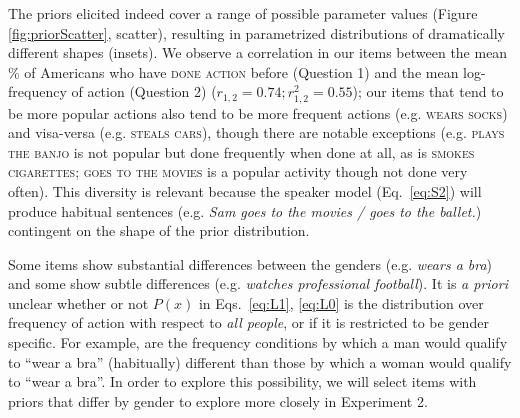 \documentclass[10pt,letterpaper]{article}
\newcommand{\ndg}[1]{\textcolor{Green}{[ndg: #1]}}
\newcommand{\mht}[1]{\textcolor{DarkOrange}{[mht: #1]}}
\begin{document}
The priors elicited indeed cover a range of possible parameter values (Figure \ref{fig:priorScatter}, scatter), resulting in parametrized distributions of dramatically different shapes (insets).  
We observe a correlation in our items between the mean \% of Americans who have \textsc{done action} before (Question 1) and the mean log-frequency  of action (Question 2) ($r_{1,2} = 0.74; r^2_{1,2} = 0.55$); our items that tend to be more popular actions also tend to be more frequent actions (e.g. \textsc{wears socks}) and visa-versa (e.g. \textsc{steals cars}), though there are notable exceptions (e.g. \textsc{plays the banjo} is not popular but done frequently when done at all, as is \textsc{smokes cigarettes}; \textsc{goes to the movies} is a popular activity though not done very often). 
This diversity is relevant because the speaker model (Eq.~\ref{eq:S2}) will produce habitual sentences (e.g. \emph{Sam goes to the movies / goes to the ballet.}) contingent on the shape of the prior distribution. 

Some items show substantial differences between the genders (e.g. \emph{wears a bra}) and some show subtle differences (e.g. \emph{watches professional football}). 
It is \emph{a priori} unclear whether or not $P(x)$ in Eqs.~\ref{eq:L1}, \ref{eq:L0} is the distribution over frequency of action with respect to \emph{all people}, or if it is restricted to be gender specific.
For example, are the frequency conditions by which a man would qualify to ``wear a bra'' (habitually) different than those by which a woman would qualify to ``wear a bra''.
In order to explore this possibility, we will select items with priors that differ by gender to explore more closely in Experiment 2.


\end{document}
